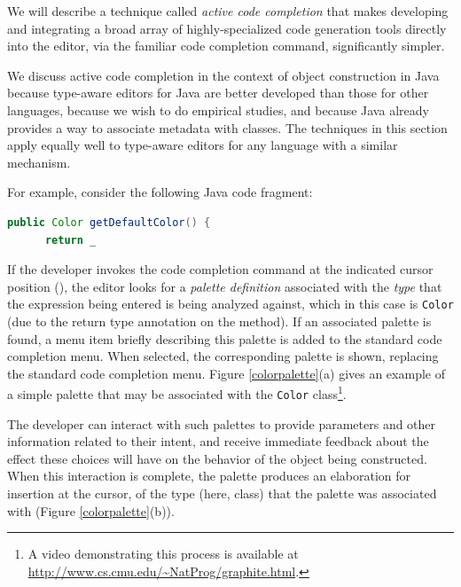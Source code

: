 \begin{contribution}
We will describe a technique called {\it active code completion} that  makes developing and integrating a broad array of highly-specialized code generation tools directly into the editor, via the familiar code completion command, significantly simpler.%

 We discuss active code completion in the context of object construction in Java because type-aware editors for Java are better developed than those for other languages, because we wish to do empirical studies, and because Java already provides a way to associate metadata with classes. The techniques in this section apply equally well to type-aware editors for any language with a similar mechanism. 

For example, consider the following Java code fragment:

\begin{lstlisting}[language=Java]
  public Color getDefaultColor() {
      return _
\end{lstlisting}

If the developer invokes the code completion command at the indicated cursor position (\li{_}), the editor  looks  for a {\it palette definition} associated with the {\it type} that the expression being entered is being analyzed against, which in this case is  \verb|Color| (due to the return type annotation on the method). If an associated palette is found, a menu item briefly describing this palette is added to the standard code completion menu. When selected, the corresponding palette is shown, replacing the standard code completion menu. Figure \ref{colorpalette}(a) gives an example of a simple palette that may be associated with the \verb|Color| class\footnote{A video demonstrating this process is available at \url{http://www.cs.cmu.edu/~NatProg/graphite.html}.}. 

The developer can interact with such palettes to provide parameters and other information related to their intent, and receive immediate feedback about the effect these choices will have on the behavior of the object being constructed. When this interaction is complete, the palette produces an elaboration for insertion at the cursor, of the type (here, class) that the palette was associated with (Figure \ref{colorpalette}(b)).


\end{contribution}
